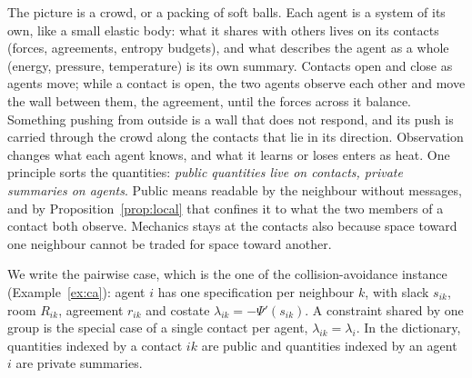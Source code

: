 \documentclass[11pt]{article}
\theoremstyle{definition}
\theoremstyle{remark}
\begin{document}
The picture is a crowd, or a packing of soft balls. Each agent is a system of its own, like a small elastic body: what it shares with others lives on its contacts (forces, agreements, entropy budgets), and what describes the agent as a whole (energy, pressure, temperature) is its own summary. Contacts open and close as agents move; while a contact is open, the two agents observe each other and move the wall between them, the agreement, until the forces across it balance. Something pushing from outside is a wall that does not respond, and its push is carried through the crowd along the contacts that lie in its direction. Observation changes what each agent knows, and what it learns or loses enters as heat. One principle sorts the quantities: \emph{public quantities live on contacts, private summaries on agents}. Public means readable by the neighbour without messages, and by Proposition~\ref{prop:local} that confines it to what the two members of a contact both observe. Mechanics stays at the contacts also because space toward one neighbour cannot be traded for space toward another.

We write the pairwise case, which is the one of the collision-avoidance instance (Example~\ref{ex:ca}): agent $i$ has one specification per neighbour $k$, with slack $s_{ik}$, room $R_{ik}$, agreement $r_{ik}$ and costate $\lambda_{ik}=-\Psi'(s_{ik})$. A constraint shared by one group is the special case of a single contact per agent, $\lambda_{ik}=\lambda_i$. In the dictionary, quantities indexed by a contact $ik$ are public and quantities indexed by an agent $i$ are private summaries.
\end{document}
